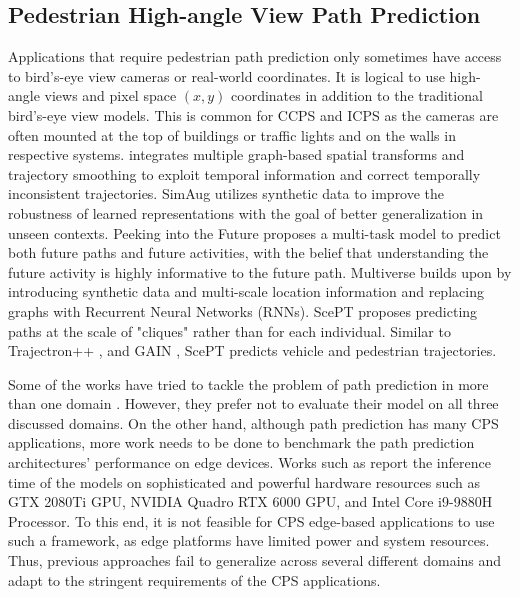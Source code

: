 \documentclass[sigconf]{acmart}
\begin{document}
\subsection{Pedestrian High-angle View Path Prediction}
Applications that require pedestrian path prediction only sometimes have access to bird's-eye view cameras or real-world coordinates. It is logical to use high-angle views and pixel space $(x,y)$ coordinates in addition to the traditional bird's-eye view models. This is common for CCPS \cite{Isern2020Reconfig} and ICPS \cite{deniz2022efficient, Chen2021TowardsOH} as the cameras are often mounted at the top of buildings or traffic lights and on the walls in respective systems. \cite{li2022graph} integrates multiple graph-based spatial transforms and trajectory smoothing to exploit temporal information and correct temporally inconsistent trajectories. SimAug \cite{liang2020simaug} utilizes synthetic data to improve the robustness of learned representations with the goal of better generalization in unseen contexts. Peeking into the Future \cite{liang2019peeking} proposes a multi-task model to predict both future paths and future activities, with the belief that understanding the future activity is highly informative to the future path. Multiverse \cite{liang2020garden} builds upon \cite{liang2019peeking} by introducing synthetic data and multi-scale location information and replacing graphs with Recurrent Neural Networks (RNNs). ScePT \cite{chen2022scept} proposes predicting paths at the scale of "cliques" rather than for each individual. Similar to Trajectron++ \cite{salzmann2020trajectron++}, and GAIN \cite{liu2022multi}, ScePT predicts vehicle and pedestrian trajectories. 


Some of the works have tried to tackle the problem of path prediction in more than one domain \cite{liu2022multi, salzmann2020trajectron++, liang2019peeking, zhao2020spatial}. However, they prefer not to evaluate their model on all three discussed domains. On the other hand, although path prediction has many CPS applications, more work needs to be done to benchmark the path prediction architectures' performance on edge devices. Works such as \cite{Chen_2021_ICCV, Shafiee_2021_CVPR, Wang_2021_WACV, peng2021sra} report the inference time of the models on sophisticated and powerful hardware resources such as GTX 2080Ti GPU, NVIDIA Quadro RTX 6000 GPU, and Intel Core i9-9880H Processor. To this end, it is not feasible for CPS edge-based applications to use such a framework, as edge platforms have limited power and system resources. Thus, previous approaches fail to generalize across several different domains and adapt to the stringent requirements of the CPS applications.
\end{document}
